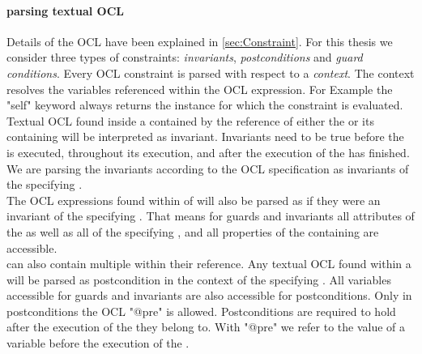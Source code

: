 \paragraph{parsing textual OCL}
\label{sec:OCLParsing}
Details of the OCL have been explained in \ref{sec:Constraint}. For this thesis we consider three types of constraints: \emph{invariants}, \emph{postconditions} and \emph{guard conditions}. Every OCL constraint is parsed with respect to a \emph{context}. The context resolves the variables referenced within the OCL expression. For Example the "self" keyword always returns the instance for which the constraint is evaluated.\\
Textual OCL found inside a  contained by the  reference of either the  or its containing  will be interpreted as invariant. Invariants need to be true before the  is executed, throughout its execution, and after the execution of the  has finished. We are parsing the invariants according to the OCL specification as invariants of the specifying . \\
The OCL expressions found within  of  will also be parsed as if they were an invariant of the specifying .
That means for guards and invariants all attributes of the  as well as all  of the specifying , and all properties of the containing  are accessible.\\
 can also contain multiple  within their  reference. Any textual OCL found within a  will be parsed as postcondition in the context of the specifying . All variables accessible for guards and invariants are also accessible for postconditions. Only in postconditions the OCL "@pre" is allowed. Postconditions are required to hold after the execution of the  they belong to. With "@pre" we refer to the value of a variable before the execution of the .

